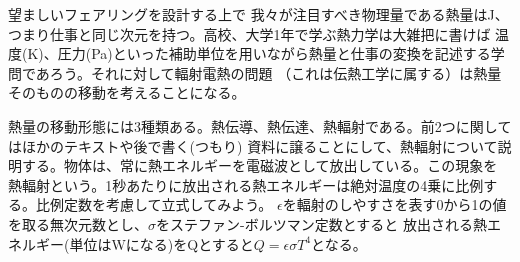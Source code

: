望ましいフェアリングを設計する上で
我々が注目すべき物理量である熱量はJ、つまり仕事と同じ次元を持つ。高校、大学1年で学ぶ熱力学は大雑把に書けば
温度(K)、圧力(Pa)といった補助単位を用いながら熱量と仕事の変換を記述する学問であろう。それに対して輻射電熱の問題
（これは伝熱工学に属する）は熱量そのものの移動を考えることになる。\par
熱量の移動形態には3種類ある。熱伝導、熱伝達、熱輻射である。前2つに関してはほかのテキストや後で書く(つもり)
資料に譲ることにして、熱輻射について説明する。物体は、常に熱エネルギーを電磁波として放出している。この現象を
熱輻射という。1秒あたりに放出される熱エネルギーは絶対温度の4乗に比例する。比例定数を考慮して立式してみよう。
$\epsilon$を輻射のしやすさを表す0から1の値を取る無次元数とし、$\sigma$をステファン-ボルツマン定数とすると
放出される熱エネルギー(単位はWになる)をQとすると$Q = \epsilon \sigma T^{4}$となる。